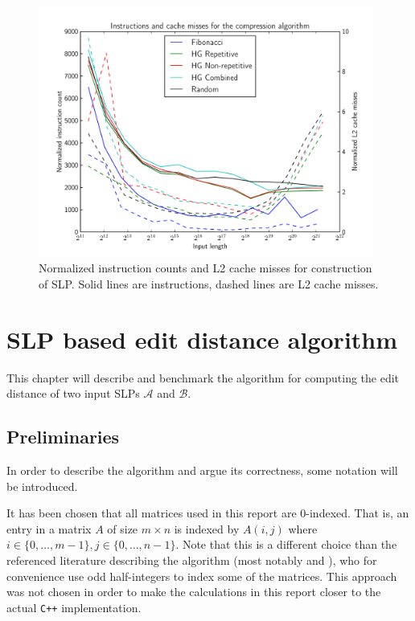 \documentclass[twoside,11pt,openright]{report}
\newcommand{\SLP}[1] {\mathcal{#1}}
\begin{document}
\begin{figure}[!htb]
  \centering
  \includegraphics[width=11cm]{compression/instructions}
  \caption{Normalized instruction counts and L2 cache misses for construction of SLP. Solid lines are instructions, dashed lines are L2 cache misses.}
  \label{fig:compression:instructions}
\end{figure}

\chapter{SLP based edit distance algorithm}
\label{ch:algorithm}

This chapter will describe and benchmark the algorithm for computing the edit distance of two input SLPs $\SLP{A}$ and $\SLP{B}$.

\section{Preliminaries}
\label{sec:algorithm:preliminaries}
In order to describe the algorithm and argue its correctness, some notation will be introduced.

It has been chosen that all matrices used in this report are $0$-indexed. That is, an entry in a matrix $A$ of size $m \times n$ is indexed by $A(i, j)$ where $i \in \{0, \dots, m - 1\}, j \in \{0, \dots, n - 1\}$. Note that this is a different choice than the referenced literature describing the algorithm (most notably \cite{Tiskin:2010:FDM:1873601.1873704} and \cite{DBLP:journals/corr/abs-0707-3619}), who for convenience use odd half-integers to index some of the matrices. This approach was not chosen in order to make the calculations in this report closer to the actual \texttt{C++} implementation.
\end{document}
